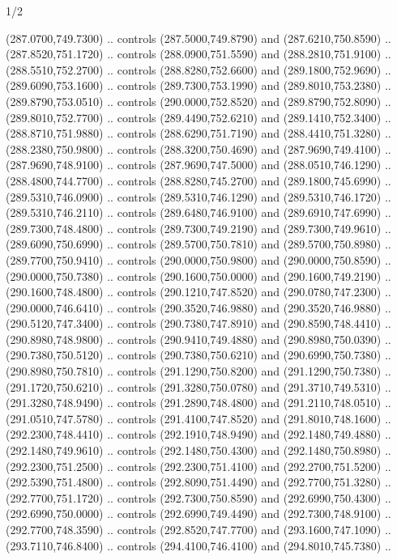 \begin{flagdescription}{1/2}
\begin{scope}[xshift=0.5\flaglength]
\begin{scope}[scale=0.00745\flagwidth,xshift=-12.1mm,yshift=41.7mm]
\begin{scope}[y=0.80pt, x=0.80pt, yscale=-1, xscale=1, inner sep=0pt, outer sep=0pt]
\begin{scope}[cm={{1.33333,0.0,0.0,-1.33333,(0.0,114.66667)}}]
\begin{scope}[scale=0.100]
  (287.0700,749.7300) .. controls (287.5000,749.8790) and (287.6210,750.8590) ..
  (287.8520,751.1720) .. controls (288.0900,751.5590) and (288.2810,751.9100) ..
  (288.5510,752.2700) .. controls (288.8280,752.6600) and (289.1800,752.9690) ..
  (289.6090,753.1600) .. controls (289.7300,753.1990) and (289.8010,753.2380) ..
  (289.8790,753.0510) .. controls (290.0000,752.8520) and (289.8790,752.8090) ..
  (289.8010,752.7700) .. controls (289.4490,752.6210) and (289.1410,752.3400) ..
  (288.8710,751.9880) .. controls (288.6290,751.7190) and (288.4410,751.3280) ..
  (288.2380,750.9800) .. controls (288.3200,750.4690) and (287.9690,749.4100) ..
  (287.9690,748.9100) .. controls (287.9690,747.5000) and (288.0510,746.1290) ..
  (288.4800,744.7700) .. controls (288.8280,745.2700) and (289.1800,745.6990) ..
  (289.5310,746.0900) .. controls (289.5310,746.1290) and (289.5310,746.1720) ..
  (289.5310,746.2110) .. controls (289.6480,746.9100) and (289.6910,747.6990) ..
  (289.7300,748.4800) .. controls (289.7300,749.2190) and (289.7300,749.9610) ..
  (289.6090,750.6990) .. controls (289.5700,750.7810) and (289.5700,750.8980) ..
  (289.7700,750.9410) .. controls (290.0000,750.9800) and (290.0000,750.8590) ..
  (290.0000,750.7380) .. controls (290.1600,750.0000) and (290.1600,749.2190) ..
  (290.1600,748.4800) .. controls (290.1210,747.8520) and (290.0780,747.2300) ..
  (290.0000,746.6410) .. controls (290.3520,746.9880) and (290.3520,746.9880) ..
  (290.5120,747.3400) .. controls (290.7380,747.8910) and (290.8590,748.4410) ..
  (290.8980,748.9800) .. controls (290.9410,749.4880) and (290.8980,750.0390) ..
  (290.7380,750.5120) .. controls (290.7380,750.6210) and (290.6990,750.7380) ..
  (290.8980,750.7810) .. controls (291.1290,750.8200) and (291.1290,750.7380) ..
  (291.1720,750.6210) .. controls (291.3280,750.0780) and (291.3710,749.5310) ..
  (291.3280,748.9490) .. controls (291.2890,748.4800) and (291.2110,748.0510) ..
  (291.0510,747.5780) .. controls (291.4100,747.8520) and (291.8010,748.1600) ..
  (292.2300,748.4410) .. controls (292.1910,748.9490) and (292.1480,749.4880) ..
  (292.1480,749.9610) .. controls (292.1480,750.4300) and (292.1480,750.8980) ..
  (292.2300,751.2500) .. controls (292.2300,751.4100) and (292.2700,751.5200) ..
  (292.5390,751.4800) .. controls (292.8090,751.4490) and (292.7700,751.3280) ..
  (292.7700,751.1720) .. controls (292.7300,750.8590) and (292.6990,750.4300) ..
  (292.6990,750.0000) .. controls (292.6990,749.4490) and (292.7300,748.9100) ..
  (292.7700,748.3590) .. controls (292.8520,747.7700) and (293.1600,747.1090) ..
  (293.7110,746.8400) .. controls (294.4100,746.4100) and (294.8010,745.7380) ..

\end{scope}
\end{scope}
\end{scope}
\end{scope}
\end{scope}
\end{flagdescription}
